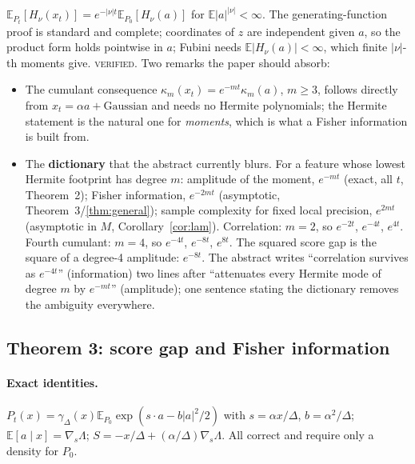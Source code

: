 \documentclass[11pt,a4paper]{article}
\newcommand{\hi}[1]{\textbf{#1}}
\newcommand{\sev}[1]{\textsc{#1}}
\newcommand{\E}{\mathbb{E}}
\theoremstyle{definition}
\theoremstyle{remark}
\begin{document}
$\E_{P_t}[H_\nu(x_t)]=e^{-|\nu|t}\E_{P_0}[H_\nu(a)]$ for $\E|a|^{|\nu|}<\infty$. The generating-function proof is standard and complete; coordinates of $z$ are independent given $a$, so the product form holds pointwise in $a$; Fubini needs $\E|H_\nu(a)|<\infty$, which finite $|\nu|$-th moments give. \sev{verified}. Two remarks the paper should absorb:
\begin{itemize}
\item The cumulant consequence $\kappa_m(x_t)=e^{-mt}\kappa_m(a)$, $m\ge3$, follows directly from $x_t=\alpha a+\text{Gaussian}$ and needs no Hermite polynomials; the Hermite statement is the natural one for \emph{moments}, which is what a Fisher information is built from.
\item The \hi{dictionary} that the abstract currently blurs. For a feature whose lowest Hermite footprint has degree $m$: amplitude of the moment, $e^{-mt}$ (exact, all $t$, Theorem~2); Fisher information, $e^{-2mt}$ (asymptotic, Theorem~3/\ref{thm:general}); sample complexity for fixed local precision, $e^{2mt}$ (asymptotic in $M$, Corollary~\ref{cor:lam}). Correlation: $m=2$, so $e^{-2t}$, $e^{-4t}$, $e^{4t}$. Fourth cumulant: $m=4$, so $e^{-4t}$, $e^{-8t}$, $e^{8t}$. The squared score gap is the square of a degree-4 amplitude: $e^{-8t}$. The abstract writes ``correlation survives as $e^{-4t}$'' (information) two lines after ``attenuates every Hermite mode of degree $m$ by $e^{-mt}$'' (amplitude); one sentence stating the dictionary removes the ambiguity everywhere.
\end{itemize}

\subsection{Theorem 3: score gap and Fisher information}
\label{sec:thm3}

\paragraph{Exact identities.} $P_t(x)=\gamma_\Delta(x)\E_{P_0}\exp(s\cdot a-b|a|^2/2)$ with $s=\alpha x/\Delta$, $b=\alpha^2/\Delta$; $\E[a\mid x]=\nabla_s\Lambda$; $S=-x/\Delta+(\alpha/\Delta)\nabla_s\Lambda$. All correct and require only a density for $P_0$.
\end{document}
